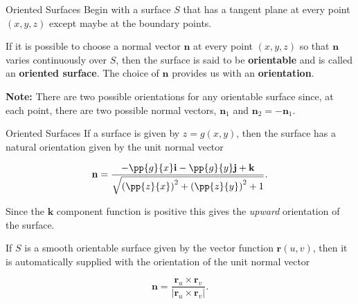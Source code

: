 \documentclass[11pt,english,
handout
]{beamer}
\begin{document}
\begin{frame}[t]{Oriented Surfaces}
\small
Begin with a surface $S$ that has a tangent plane at every point $(x,y,z)$ except maybe at the boundary points.\pause

\lspace
\begin{definition}
If it is possible to choose a normal vector $\mathbf{n}$ at every point $(x,y,z)$ so that $\mathbf{n}$ varies continuously over $S$, then the surface is said to be \textbf{orientable} and is called an \textbf{oriented surface}. The choice of $\mathbf{n}$ provides us with an \textbf{orientation}.
\end{definition}

\lspace
\textbf{Note:} There are two possible orientations for any orientable surface since, at each point, there are two possible normal vectors, $\mathbf{n}_1$ and $\mathbf{n}_2=-\mathbf{n}_1$.
\end{frame}











\begin{frame}[t]{Oriented Surfaces}
\small
If a surface is given by $z=g(x,y)$, then the surface has a natural orientation given by the unit normal vector

\[
\mathbf{n}=\frac{-\pp{g}{x}\mathbf{i}-\pp{g}{y}\mathbf{j}+\mathbf{k}}{\sqrt{\left(\pp{z}{x}\right)^2+\left(\pp{z}{y}\right)^2+1}}.
\]\pause 

Since the $\mathbf{k}$ component function is positive this gives the \textit{upward} orientation of the surface.\pause

\lspace
If $S$ is a smooth orientable surface given by the vector function $\mathbf{r}(u,v)$, then it is automatically supplied with the orientation of the unit normal vector

\[
\mathbf{n}=\frac{\mathbf{r}_u\times\mathbf{r}_v}{|\mathbf{r}_u\times\mathbf{r}_v|}.
\]
\end{frame}
\end{document}
